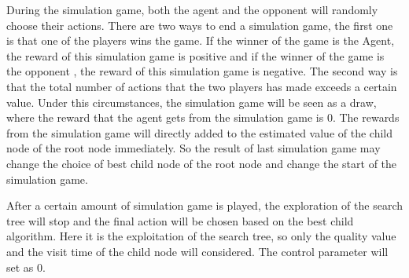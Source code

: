 During the simulation game, both the agent and the opponent will randomly choose their actions. 
There are two ways to end a simulation game, the first one is that one of the players wins the game. 
If the winner of the game is the Agent, the reward of this simulation game is positive and if the winner of the game is the opponent , the reward of this simulation game is negative. 
The second way is that the total number of actions that the two players has made exceeds a certain value. 
Under this circumstances, the simulation game will be seen as a draw, where the reward that the agent gets from the simulation game is 0. 
The rewards from the simulation game will directly added to the estimated value of the child node of the root node immediately. 
So the result of last simulation game may change the choice of best child node of the root node and change the start of the simulation game. 

After a certain amount of simulation game is played, the exploration of the search tree will stop and the final action will be chosen based on the best child algorithm. 
Here it is the exploitation of the search tree, so only the quality value and the visit time of the child node will considered. 
The control parameter will set as 0. 